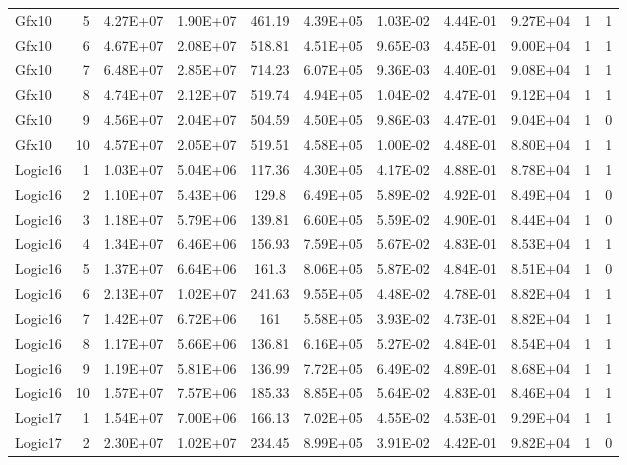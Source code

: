 \begin{longtable}{@{}l!{\vrule}r!{\vrule}c!{\vrule}c!{\vrule}c!{\vrule}c!{\vrule}c!{\vrule}c!{\vrule}c!{\vrule}c!{\vrule}c@{}}
Gfx10 & 5 & 4.27E+07 & 1.90E+07 & 461.19 & 4.39E+05 & 1.03E-02 & 4.44E-01 & 9.27E+04 & 1 & 1 \\
Gfx10 & 6 & 4.67E+07 & 2.08E+07 & 518.81 & 4.51E+05 & 9.65E-03 & 4.45E-01 & 9.00E+04 & 1 & 1 \\
Gfx10 & 7 & 6.48E+07 & 2.85E+07 & 714.23 & 6.07E+05 & 9.36E-03 & 4.40E-01 & 9.08E+04 & 1 & 1 \\
Gfx10 & 8 & 4.74E+07 & 2.12E+07 & 519.74 & 4.94E+05 & 1.04E-02 & 4.47E-01 & 9.12E+04 & 1 & 1 \\
Gfx10 & 9 & 4.56E+07 & 2.04E+07 & 504.59 & 4.50E+05 & 9.86E-03 & 4.47E-01 & 9.04E+04 & 1 & 0 \\
Gfx10 & 10 & 4.57E+07 & 2.05E+07 & 519.51 & 4.58E+05 & 1.00E-02 & 4.48E-01 & 8.80E+04 & 1 & 1 \\
\hline
Logic16 & 1 & 1.03E+07 & 5.04E+06 & 117.36 & 4.30E+05 & 4.17E-02 & 4.88E-01 & 8.78E+04 & 1 & 1 \\
Logic16 & 2 & 1.10E+07 & 5.43E+06 & 129.8 & 6.49E+05 & 5.89E-02 & 4.92E-01 & 8.49E+04 & 1 & 0 \\
Logic16 & 3 & 1.18E+07 & 5.79E+06 & 139.81 & 6.60E+05 & 5.59E-02 & 4.90E-01 & 8.44E+04 & 1 & 0 \\
Logic16 & 4 & 1.34E+07 & 6.46E+06 & 156.93 & 7.59E+05 & 5.67E-02 & 4.83E-01 & 8.53E+04 & 1 & 1 \\
Logic16 & 5 & 1.37E+07 & 6.64E+06 & 161.3 & 8.06E+05 & 5.87E-02 & 4.84E-01 & 8.51E+04 & 1 & 0 \\
Logic16 & 6 & 2.13E+07 & 1.02E+07 & 241.63 & 9.55E+05 & 4.48E-02 & 4.78E-01 & 8.82E+04 & 1 & 1 \\
Logic16 & 7 & 1.42E+07 & 6.72E+06 & 161 & 5.58E+05 & 3.93E-02 & 4.73E-01 & 8.82E+04 & 1 & 1 \\
Logic16 & 8 & 1.17E+07 & 5.66E+06 & 136.81 & 6.16E+05 & 5.27E-02 & 4.84E-01 & 8.54E+04 & 1 & 1 \\
Logic16 & 9 & 1.19E+07 & 5.81E+06 & 136.99 & 7.72E+05 & 6.49E-02 & 4.89E-01 & 8.68E+04 & 1 & 1 \\
Logic16 & 10 & 1.57E+07 & 7.57E+06 & 185.33 & 8.85E+05 & 5.64E-02 & 4.83E-01 & 8.46E+04 & 1 & 1 \\
\hline
{}
Logic17 & 1 & 1.54E+07 & 7.00E+06 & 166.13 & 7.02E+05 & 4.55E-02 & 4.53E-01 & 9.29E+04 & 1 & 1 \\
Logic17 & 2 & 2.30E+07 & 1.02E+07 & 234.45 & 8.99E+05 & 3.91E-02 & 4.42E-01 & 9.82E+04 & 1 & 0 \\

\end{longtable}
